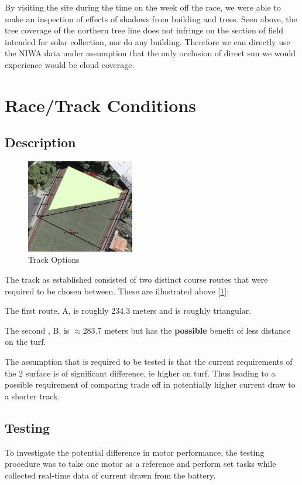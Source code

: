 \documentclass[11pt]{article}
\begin{document}
By visiting the site during the time on the week off the race, we were able to make an inspection of effects of shadows from building and trees. Seen above, the tree coverage of the northern tree line does not infringe on the section of field intended for solar collection, nor do any building. Therefore we can directly use the NIWA data under assumption that the only occlusion of direct sun we would experience would be cloud coverage.

\section{Race/Track Conditions}
\subsection{Description}
\begin{figure}[h!]
    \begin{center}
        \includegraphics[width=0.42\textwidth]{inc/tracks.png}
        \caption{Track Options \cite{DANNYB}}
        \label{fig:routes}
    \end{center}
\end{figure}

The track as established consisted of two distinct course routes that were required to be chosen between. These are illustrated above [\ref{fig:routes}]: 

The first route, A, is roughly 234.3 meters and is roughly triangular.

The second , B, is $\approx 283.7$ meters but has the \textbf{possible} benefit of less distance on the turf.

The assumption that is required to be tested is that the current requirements of the 2 surface is of significant difference, ie higher on turf. Thus leading to a possible requirement of comparing trade off in potentially higher current draw to a shorter track.

\subsection{Testing}
To investigate the potential difference in motor performance, the testing procedure was to take one motor as a reference and perform set tasks while collected real-time data of current drawn from the battery.
\end{document}
